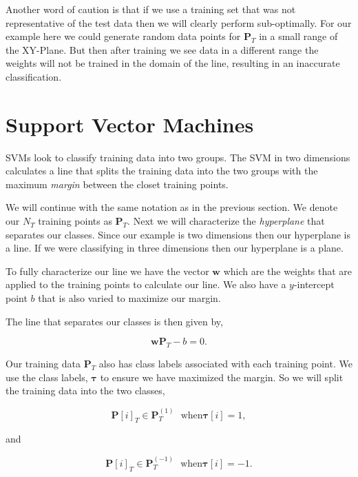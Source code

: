 Another word of caution is that if we use a training set that was not representative of the test data then we will clearly perform sub-optimally. For our example here we could generate random data points for $\mathbf{P}_T$ in a small range of the XY-Plane. But then after training we see data in a different range the weights will not be trained in the domain of the line, resulting in an inaccurate classification.

	
\section{Support Vector Machines}
	
\ac{SVM}s look to classify training data into two groups. The \ac{SVM} in two dimensions calculates a line that splits the training data into the two groups with the maximum \emph{margin} between the closet training points. 

We will continue with the same notation as in the previous section. We denote our $N_T$ training points as $\mathbf{P}_T$. Next we will characterize the \emph{hyperplane} that separates our classes. Since our example is two dimensions then our hyperplane is a line. If we were classifying in three dimensions then our hyperplane is a plane. 

To fully characterize our line we have the vector $\mathbf{w}$ which are the weights that are applied to the training points to calculate our line. We also have a $y$-intercept point $b$ that is also varied to maximize our margin. 

The line that separates our classes is then given by,

\begin{equation}
\mathbf{w}\mathbf{P}_T - b = 0.
\end{equation}

Our training data $\mathbf{P}_T$ also has class labels associated with each training point. We use the class labels, $\mathbf{\tau}$ to ensure we have maximized the margin. So we will split the training data into the two classes, 

\begin{equation}
\mathbf{P}[i]_T \in \mathbf{P}^{(1)}_T ~~~ \text{when} \mathbf{\tau}[i] = 1,
\end{equation}
	
and

\begin{equation}
\mathbf{P}[i]_T \in \mathbf{P}^{(-1)}_T ~~~ \text{when} \mathbf{\tau}[i] = -1.
\end{equation}

